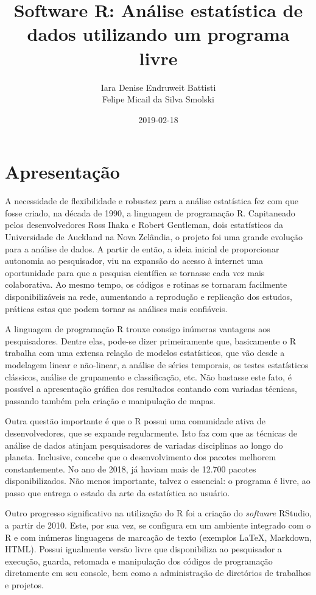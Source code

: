 \documentclass[12pt,brazil,oneside]{book}
\title{Software R: Análise estatística de dados utilizando um programa livre}
\author{Iara Denise Endruweit Battisti \\ Felipe Micail da Silva Smolski}
\date{2019-02-18}
\begin{document}
\maketitle

{
\setcounter{tocdepth}{1}
\tableofcontents
}
\hypertarget{apresentacao}{%
\chapter*{Apresentação}\label{apresentacao}}

A necessidade de flexibilidade e robustez para a análise estatística fez com que fosse criado, na década de 1990, a linguagem de programação R. Capitaneado pelos desenvolvedores Ross Ihaka e Robert Gentleman, dois estatísticos da Universidade de Auckland na Nova Zelândia, o projeto foi uma grande evolução para a análise de dados. A partir de então, a ideia inicial de proporcionar autonomia ao pesquisador, viu na expansão do acesso à internet uma oportunidade para que a pesquisa científica se tornasse cada vez mais colaborativa. Ao mesmo tempo, os códigos e rotinas se tornaram facilmente disponibilizáveis na rede, aumentando a reprodução e replicação dos estudos, práticas estas que podem tornar as análises mais confiáveis.

A linguagem de programação R trouxe consigo inúmeras vantagens aos pesquisadores. Dentre elas, pode-se dizer primeiramente que, basicamente o R trabalha com uma extensa relação de modelos estatísticos, que vão desde a modelagem linear e não-linear, a análise de séries temporais, os testes estatísticos clássicos, análise de grupamento e classificação, etc. Não bastasse este fato, é possível a apresentação gráfica dos resultados contando com variadas técnicas, passando também pela criação e manipulação de mapas.

Outra questão importante é que o R possui uma comunidade ativa de desenvolvedores, que se expande regularmente. Isto faz com que as técnicas de análise de dados atinjam pesquisadores de variadas disciplinas ao longo do planeta. Inclusive, concebe que o desenvolvimento dos pacotes melhorem constantemente. No ano de 2018, já haviam mais de 12.700 pacotes disponibilizados. Não menos importante, talvez o essencial: o programa é livre, ao passo que entrega o estado da arte da estatística ao usuário.

Outro progresso significativo na utilização do R foi a criação do \emph{software} RStudio, a partir de 2010. Este, por sua vez, se configura em um ambiente integrado com o R e com inúmeras linguagens de marcação de texto (exemplos LaTeX, Markdown, HTML). Possui igualmente versão livre que disponibiliza ao pesquisador a execução, guarda, retomada e manipulação dos códigos de programação diretamente em seu console, bem como a administração de diretórios de trabalhos e projetos.
\end{document}
